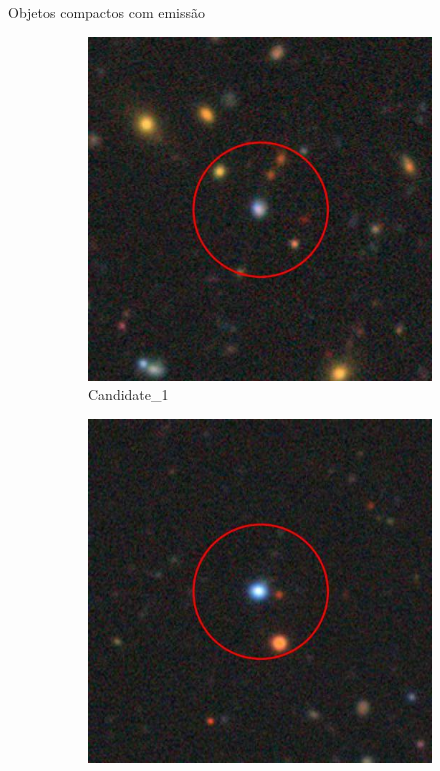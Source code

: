 \begin{frame}[c]{Objetos compactos com emissão}
\begin{figure}[h]
    \centering
    \captionsetup{justification=centering}
    \begin{subfigure}[b]{0.22\textwidth}
        \includegraphics[width=\textwidth]{images/proposatal_candidatas_2/Candidate_1.png}
        \caption{Candidate\_1}
    \end{subfigure}
    \begin{subfigure}[b]{0.22\textwidth}
        \includegraphics[width=\textwidth]{images/proposatal_candidatas_2/Candidate_2.png}

\end{subfigure}
\end{figure}
\end{frame}
